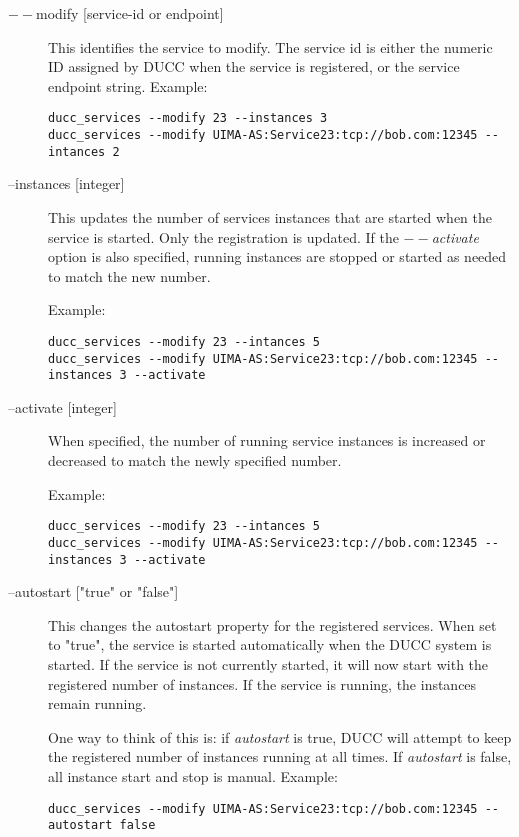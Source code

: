     \begin{description}
        \item[$--$modify {[service-id or endpoint]}]  This identifies the service to modify. The service id is either
          the numeric ID assigned by DUCC when the service is registered, or the service endpoint
          string.  Example:
\begin{verbatim}
ducc_services --modify 23 --instances 3 
ducc_services --modify UIMA-AS:Service23:tcp://bob.com:12345 --intances 2 
\end{verbatim}

        \item[ --instances {[integer]}] This updates the number of services instances that are
          started when the service is started.  Only the registration is updated. If the {\em $--$activate}
          option is also specified, running instances are stopped or started as needed to match the
          new number.

          Example: 
\begin{verbatim}
ducc_services --modify 23 --intances 5 
ducc_services --modify UIMA-AS:Service23:tcp://bob.com:12345 --instances 3 --activate 
\end{verbatim}

        \item[ --activate {[integer]}] When specified, the number of running service instances is
          increased or decreased to match the newly specified number.

          Example: 
\begin{verbatim}
ducc_services --modify 23 --intances 5 
ducc_services --modify UIMA-AS:Service23:tcp://bob.com:12345 --instances 3 --activate 
\end{verbatim}

        \item[ --autostart {["true" or "false"]}] This changes the autostart property for the
          registered services. When set to "true", the service is started automatically when the
          DUCC system is started.  If the service is not currently started, it will now start
          with the registered number of instances.  If the service is running, the instances
          remain running.

          One way to think of this is: if {\em autostart} is true, DUCC will attempt to keep
          the registered number of instances running at all times.  If {\em autostart} is
          false, all instance start and stop is manual.
          Example: 
\begin{verbatim}
ducc_services --modify UIMA-AS:Service23:tcp://bob.com:12345 --autostart false 
\end{verbatim}
        \end{description}


